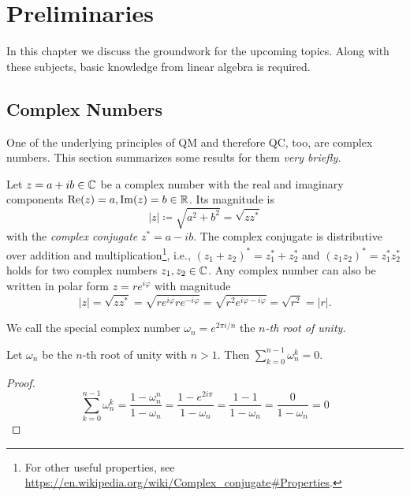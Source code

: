 \chapter{Preliminaries}
    In this chapter we discuss the groundwork for the upcoming topics. Along with these subjects, basic knowledge from linear algebra is required.

    \section{Complex Numbers}
    	One of the underlying principles of \ac{QM} and therefore \ac{QC}, too, are complex numbers. This section summarizes some results for them \emph{very briefly.}

    	Let \( z = a + ib \in \mathbb{C} \) be a complex number with the real and imaginary components \( \Re(z) = a, \Im(z) = b \in \mathbb{R} \). Its magnitude is
    	\begin{equation}
    		\lvert z \rvert \coloneqq \sqrt{a^2 + b^2} = \sqrt{z z^\ast}
    	\end{equation}
    	with the \emph{complex conjugate} \( z^\ast = a - ib \). The complex conjugate is distributive over addition and multiplication\footnote{For other useful properties, see \url{https://en.wikipedia.org/wiki/Complex_conjugate\#Properties}.}, i.e., \( (z_1 + z_2)^\ast = z_1^\ast + z_2^\ast \) and \( (z_1 z_2)^\ast = z_1^\ast z_2^\ast \) holds for two complex numbers \( z_1, z_2 \in \mathbb{C} \). Any complex number can also be written in polar form \( z = r e^{i \varphi} \) with magnitude
    	\begin{equation}
    		\lvert z \rvert = \sqrt{z z^\ast} = \sqrt{r e^{i \varphi} r e^{-i \varphi}} = \sqrt{r^2 e^{i \varphi - i \varphi}} = \sqrt{r^2} = \lvert r \rvert.
    	\end{equation}
    	\begin{definition}
	    	We call the special complex number \( \omega_n = e^{2 \pi i / n} \) the \emph{\(n\)-th root of unity.}
    	\end{definition}
    	\begin{theorem}
    		Let \( \omega_n \) be the \(n\)-th root of unity with \( n > 1 \). Then \( \sum_{k = 0}^{n - 1} \omega_n^k = 0 \).
    	\end{theorem}
    	\begin{proof}
    		\begin{equation}
    			\sum_{k = 0}^{n - 1} \omega_n^k
    				= \frac{1 - \omega_n^n}{1 - \omega_n}
    				= \frac{1 - e^{2 i \pi}}{1 - \omega_n}
    				= \frac{1 - 1}{1 - \omega_n}
    				= \frac{0}{1 - \omega_n}
    				= 0
    		\end{equation}
    	\end{proof}

